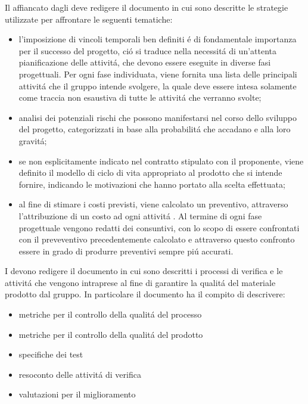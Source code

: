 Il \responsabile{} affiancato dagli \amministratori{} deve redigere il documento \PdPv{} in cui sono descritte le strategie utilizzate per affrontare le seguenti tematiche:

\begin{itemize}
    \item l'imposizione di vincoli temporali ben definiti \'{e} di fondamentale importanza per il successo del progetto, ci\'o si traduce nella necessit\'a di un'attenta pianificazione delle attivit\'a, che devono essere eseguite in diverse fasi progettuali. Per ogni fase individuata, viene fornita una lista delle principali attivit\'a che il gruppo intende svolgere, la quale deve essere intesa solamente come traccia non esaustiva di tutte le attivit\'a che verranno svolte;
    \item analisi dei potenziali rischi che possono manifestarsi nel corso dello sviluppo del progetto, categorizzati in base alla probabilit\'a che accadano e alla loro gravit\'a;
    \item se non esplicitamente indicato nel contratto stipulato con il proponente, viene definito il modello di ciclo di vita appropriato al prodotto che si intende fornire, indicando le motivazioni che hanno portato alla scelta effettuata;
    \item al fine di stimare i costi previsti, viene calcolato un preventivo, attraverso l'attribuzione di un costo ad ogni attivit\'a . Al termine di ogni fase progettuale vengono redatti dei consuntivi, con lo scopo di essere confrontati con il preveventivo precedentemente calcolato e attraverso questo confronto essere in grado di produrre preventivi sempre pi\'u accurati.
\end{itemize}

I \verificatori{} devono redigere il documento \PdQv{} in cui sono descritti i processi di verifica e le attivit\'a che vengono intraprese al fine di garantire la qualit\'a del materiale prodotto dal gruppo. In particolare il documento ha il compito di descrivere:

\begin{itemize}
    \item metriche per il controllo della qualit\'a del processo
    \item metriche per il controllo della qualit\'a del prodotto
    \item specifiche dei test
    \item resoconto delle attivit\'a di verifica
    \item valutazioni per il miglioramento
\end{itemize}
